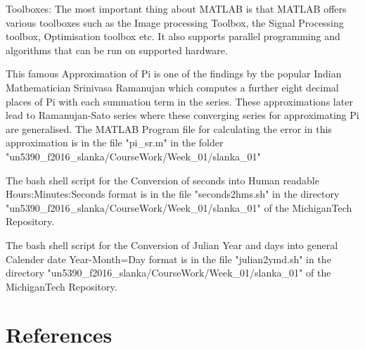 \documentclass[fleqn,letterpaper,12pt]{report}
\begin{document}
Toolboxes:\newline
The most important thing about MATLAB is that MATLAB offers various toolboxes such as the Image processing Toolbox, the Signal Processing toolbox, Optimisation toolbox etc. It also supports parallel programming and algorithms that can be run on supported hardware.

\vfill

%
\newpage
{}
{}
\problem
This famous Approximation of Pi is one of the findings by the popular Indian Mathematician Srinivasa Ramanujan which computes a further eight decimal places of Pi with each summation term in the series. These approximations later lead to Ramanujan-Sato series where these converging series for approximating Pi are generalised.\newline
The MATLAB Program file for calculating the error in this approximation is in the file "pi\_sr.m" in the folder "un5390\_f2016\_slanka/CourseWork/Week\_01/slanka\_01"\cite{Pi} 


\vfill

%
\newpage
{}
{}
\problem
The bash shell script for the Conversion of seconds into Human readable 
Hours:Minutes:Seconds format is in the file "seconds2hms.sh" in the directory "un5390\_f2016\_slanka/CourseWork/Week\_01/slanka\_01" of the MichiganTech Repository.\cite{tc}
\vfill
\newpage

%
\newpage
{}
{}
\problem
The bash shell script for the Conversion of Julian Year and days into general Calender date 
Year-Month=Day format is in the file "julian2ymd.sh" in the directory "un5390\_f2016\_slanka/CourseWork/Week\_01/slanka\_01" of the MichiganTech Repository.\cite{tc}
\vfill
\newpage
{}
\section*{References}


\end{document}

